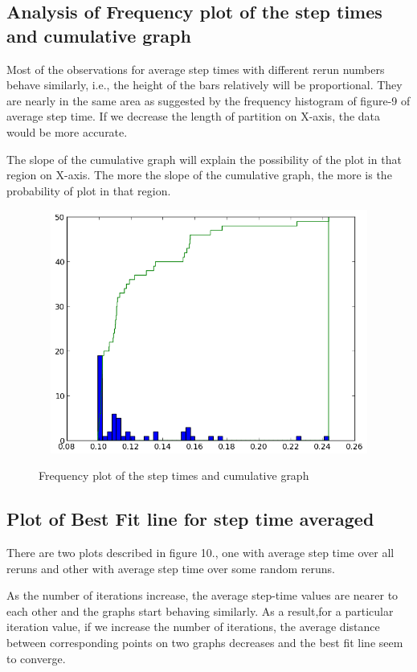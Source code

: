 \documentclass[12pt,a4paper]{report}
\begin{document}
\subsection*{Analysis of Frequency plot of the step times and cumulative graph}
\par Most of the observations for average step times with different rerun numbers behave similarly, i.e., the height of the bars relatively will be proportional. They are nearly in the same area as suggested by the frequency histogram of figure-9 of average step time. If we decrease the length of partition on X-axis, the data would be more accurate. 

The slope of the cumulative graph will explain the possibility of the plot in that region on X-axis. The more the slope of the cumulative graph, the more is the probability of plot in that region.


\begin{figure}
\includegraphics[width=12cm,height=8cm]{g20_project_plot04} 
\label{fig:plt4}
\caption{Frequency plot of the step times and cumulative graph} 
\end{figure}



\subsection*{Plot of Best Fit line for step time averaged}
\par There are two plots described in figure 10., one with average step time over all reruns and other with average step time over some random reruns.

As the number of iterations increase, the average step-time values are nearer to each other and the graphs start behaving similarly. As a result,for a particular iteration value, if we increase the number of iterations, the average distance between corresponding points on two graphs decreases and the best fit line seem to converge.
\end{document}
